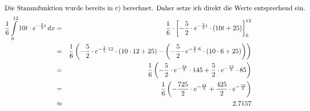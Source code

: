 \documentclass[10pt,a4paper,oneside,ngerman,numbers=noenddot]{scrartcl}
\begin{document}
\subsection{} %
\begin{alignat*}{2}
\intertext{Die Stammfunktion wurde bereits in c) berechnet. Daher setze ich direkt die Werte entsprechend ein.}
\frac{1}{6} \int\limits_{6}^{12} 10t \cdot e^{-\frac{2}{5}t}\,dx &=& \frac{1}{6} \cdot \left[-\frac{5}{2}\cdot e^{-\frac{2}{5}t} \cdot (10t + 25)\right]_{6}^{12} \\
&=& \frac{1}{6}\left(-\frac{5}{2}\cdot e^{-\frac{2}{5} \cdot 12} \cdot ( 10 \cdot 12 + 25) - \left(-\frac{5}{2}\cdot e^{-\frac{2}{5} \cdot 6} \cdot ( 10 \cdot 6 + 25)\right)\right) \\
&=& \frac{1}{6}\left(-\frac{5}{2}\cdot e^{-\frac{24}{5}} \cdot 145 + \frac{5}{2}\cdot e^{-\frac{12}{5}} \cdot 85\right) \\
&=& \frac{1}{6}\left(-\frac{725}{2}\cdot e^{-\frac{24}{5}} + \frac{425}{2}\cdot e^{-\frac{12}{5}}\right) \\
&\approx & 2.7157
\end{alignat*}
\end{document}
